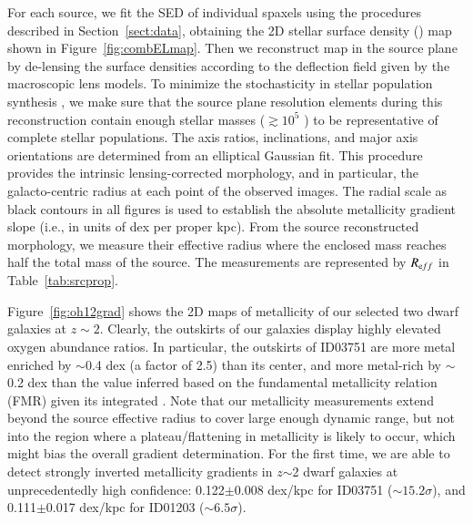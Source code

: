 For each source, we fit the SED of individual spaxels using the procedures described in Section~\ref{sect:data}, 
obtaining the 2D stellar surface density (\Sstar) map shown in Figure~\ref{fig:combELmap}. Then we reconstruct 
\Sstar map in the source plane by de-lensing the surface densities according to the deflection field given by the 
macroscopic lens models.
To minimize the stochasticity in stellar population synthesis \citep{Fouesneau:2010ea,Eldridge:2012ds}, 
we make sure that the source plane resolution elements during this reconstruction contain enough stellar masses 
($\gtrsim 10^5$ \Msun) to be representative of complete stellar populations.
The axis ratios, inclinations, and major axis orientations are determined from an elliptical Gaussian fit. This 
procedure provides the intrinsic lensing-corrected morphology, and in particular, the galacto-centric radius at 
each point of the observed images.
The radial scale as black contours in all figures is used to establish the absolute metallicity gradient slope (i.e., in units of 
dex per proper kpc).
From the source reconstructed morphology, we measure their effective radius where the enclosed mass 
reaches half the total mass of the source. The measurements are represented by $R_{\rm eff}$ in 
Table~\ref{tab:srcprop}.

Figure~\ref{fig:oh12grad} shows the 2D maps of metallicity of our selected two dwarf galaxies at $z\sim2$.
Clearly, the outskirts of our galaxies display highly elevated oxygen abundance ratios.
In particular, the outskirts of ID03751 are more metal enriched by $\sim$0.4 dex (\ie a factor of 2.5) than its center, and more 
metal-rich by $\sim$0.2 dex than the value inferred based on the fundamental metallicity relation (FMR) given its 
integrated \Mstar \cite{2010MNRAS.408.2115M,Mannucci:2011be}.
Note that our metallicity measurements extend beyond the source effective radius to cover large enough 
dynamic range, but not into the region where a plateau/flattening in metallicity \citep[\ie, at $R>2-2.5 R_{\rm 
eff}$,][]{2014A&A...563A..49S,SanchezMenguiano:2016gj,Molla:2018em} is likely to occur, which might bias the 
overall gradient determination.
For the first time, we are able to detect strongly inverted metallicity gradients in $z$$\sim$2 dwarf galaxies
at unprecedentedly high confidence: 0.122$\pm$0.008 dex/kpc for ID03751 ($\sim15.2\sigma$), and
0.111$\pm$0.017 dex/kpc for ID01203 ($\sim6.5\sigma$).

